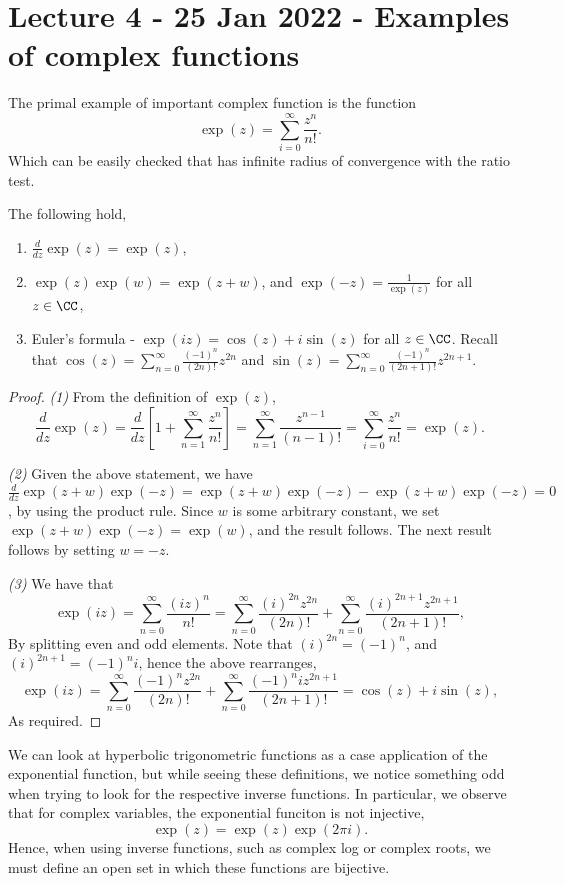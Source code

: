 \section{Lecture 4 - 25 Jan 2022 - Examples of complex functions}
The primal example of important complex function is the function
\[\exp(z)= \sum_{i=0}^{\infty}\frac{z^n}{n!}.\]
Which can be easily checked that has infinite radius of convergence with the
ratio test.

\begin{lemma}
  The following hold,
  \begin{enumerate}
    \item $\frac{d}{dz}\exp(z)=\exp(z)$,
    \item $\exp(z)\exp(w)=\exp(z+w)$, and $\exp(-z)=\frac{1}{\exp(z)}$ for all
      $z\in\CC$,
    \item Euler's formula - $\exp(iz)=\cos(z)+i\sin(z)$ for all $z\in\CC$.
      Recall that $\cos(z)= \sum_{n=0}^{\infty}\frac{(-1)^n}{(2n)!}z^{2n}$ and
      $\sin(z)= \sum_{n=0}^{\infty}\frac{(-1)^n}{(2n+1)!}z^{2n+1}$.
  \end{enumerate}
  \label{lem:expProperties}
\end{lemma}
\begin{proof}
  \emph{(1)} From the definition of $\exp(z)$,
  \[\frac{d}{dz}\exp(z)=\frac{d}{dz} \left[ 1 +
    \sum_{n=1}^{\infty}\frac{z^{n}}{n!}\right]= \sum_{n=1}^{\infty}
  \frac{z^{n-1}}{(n-1)!} = \sum_{i=0}^{\infty}\frac{z^n}{n!} = \exp(z).\]

  \emph{(2)} Given the above statement, we have
  $\frac{d}{dz}\exp(z+w)\exp(-z)=\exp(z+w)\exp(-z) - \exp(z+w)\exp(-z)=0$, by
  using the product rule. Since $w$ is some arbitrary constant, we set
  $\exp(z+w)\exp(-z)= \exp(w)$, and the result follows. The next result follows
  by setting $w=-z$.

  \emph{(3)} We have that 
  \[\exp(iz)= \sum_{n=0}^{\infty} \frac{(iz)^n}{n!} = \sum_{n=0}^{\infty}
  \frac{(i)^{2n}z^{2n}}{(2n)!} + \sum_{n=0}^{\infty}
  \frac{(i)^{2n+1}z^{2n+1}}{(2n+1)!},\]
  By splitting even and odd elements. Note that $(i)^{2n}=(-1)^{n}$, and
  $(i)^{2n+1}=(-1)^{n}i$, hence the above rearranges,
  \[\exp(iz) = \sum_{n=0}^{\infty}
  \frac{(-1)^{n}z^{2n}}{(2n)!} + \sum_{n=0}^{\infty}
  \frac{(-1)^{n}iz^{2n+1}}{(2n+1)!} = \cos(z)+i\sin(z),\]
  As required.
\end{proof}

We can look at hyperbolic trigonometric functions as a case application of the
exponential function, but while seeing these definitions, we notice something
odd when trying to look for the respective inverse functions. In particular, we
observe that for complex variables, the exponential funciton is not injective,
\[\exp(z)= \exp(z)\exp(2\pi i).\]
Hence, when using inverse functions, such as complex log or complex roots, we
must define an open set in which these functions are bijective.

